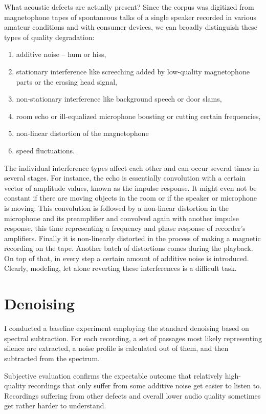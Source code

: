 \documentclass[12pt,a4paper]{report}
\begin{document}
What acoustic defects are actually present? Since the corpus was digitized from
magnetophone tapes of spontaneous talks of a single speaker recorded in various
amateur conditions and with consumer devices, we can broadly distinguish these
types of quality degradation:
\begin{enumerate}
\item{additive noise -- hum or hiss,}
\item{
    stationary interference like screeching added by low-quality magnetophone
    parts or the erasing head signal,
}
\item{non-stationary interference like background speech or door slams,}
\item{
    room echo or ill-equalized microphone boosting or cutting certain
    frequencies,
}
\item{non-linear distortion of the magnetophone}
\item{speed fluctuations.}
\end{enumerate}

The individual interference types affect each other and can occur several times
in several stages. For instance, the echo is essentially convolution with a certain vector of
amplitude values, known as the impulse response. It might even not be
constant if there are moving objects in the room or if the speaker or
microphone is moving. This convolution is followed by a non-linear
distortion in the microphone and its preamplifier and convolved again with
another impulse response, this time representing a frequency and phase
response of recorder's amplifiers. Finally it is non-linearly distorted in
the process of making a magnetic recording on the tape. Another batch of
distortions comes during the playback. On top of that, in every step a certain
amount of additive noise is introduced. Clearly, modeling, let alone reverting these
interferences is a difficult task.

\section{Denoising}

I conducted a baseline experiment employing the standard denoising based on
spectral subtraction. For each recording, a set of passages most likely
representing silence are extracted, a noise profile is calculated out of them,
and then subtracted from the spectrum.

Subjective evaluation confirms the expectable outcome that relatively
high-quality recordings that only suffer from some additive noise get
easier to listen to. Recordings suffering from other defects and overall lower
audio quality sometimes get rather harder to understand.
\end{document}
